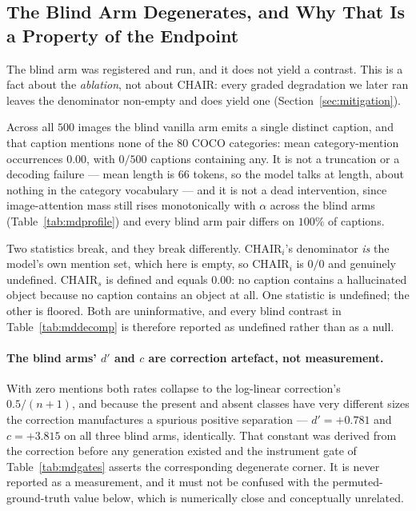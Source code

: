 \subsection{The Blind Arm Degenerates, and Why That Is a Property of the Endpoint}
\label{app:mitig-blind}

The blind arm was registered and run, and it does not yield a contrast. This is a fact about the
\emph{ablation}, not about CHAIR: every graded degradation we later ran leaves the denominator
non-empty and does yield one (Section~\ref{sec:mitigation}).

Across all $500$ images the blind vanilla arm emits a single distinct caption, and that caption
mentions none of the $80$ COCO categories: mean category-mention occurrences $0.00$, with $0/500$
captions containing any. It is not a truncation or a decoding failure --- mean length is $66$
tokens, so the model talks at length, about nothing in the category vocabulary --- and it is not a
dead intervention, since image-attention mass still rises monotonically with $\alpha$ across the
blind arms (Table~\ref{tab:mdprofile}) and every blind arm pair differs on $100\%$ of captions.

Two statistics break, and they break differently. $\mathrm{CHAIR}_i$'s denominator \emph{is} the
model's own mention set, which here is empty, so $\mathrm{CHAIR}_i$ is $0/0$ and genuinely
undefined. $\mathrm{CHAIR}_s$ is defined and equals $0.00$: no caption contains a hallucinated
object because no caption contains an object at all. One statistic is undefined; the other is
floored. Both are uninformative, and every blind contrast in Table~\ref{tab:mddecomp} is therefore
reported as undefined rather than as a null.

\paragraph{The blind arms' $d'$ and $c$ are correction artefact, not measurement.} With zero
mentions both rates collapse to the log-linear correction's $0.5/(n+1)$, and because the present and
absent classes have very different sizes the correction manufactures a spurious positive
separation --- $d' = +0.781$ and $c = +3.815$ on all three blind arms, identically. That constant
was derived from the correction before any generation existed and the instrument gate of
Table~\ref{tab:mdgates} asserts the corresponding degenerate corner. It is never reported as a
measurement, and it must not be confused with the permuted-ground-truth value below, which is
numerically close and conceptually unrelated.

